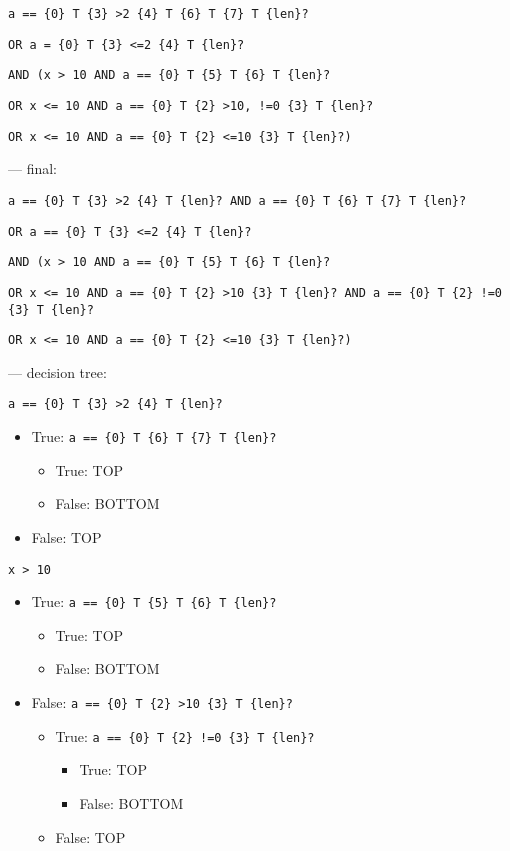 \documentclass[11pt]{article}
\begin{document}
\begin{itemize}
\verb|a == {0} T {3} >2 {4} T {6} T {7} T {len}?|

\verb|OR a = {0} T {3} <=2 {4} T {len}?|

\verb|AND (x > 10 AND a == {0} T {5} T {6} T {len}?|

\verb|OR x <= 10 AND a == {0} T {2} >10, !=0 {3} T {len}?|

\verb|OR x <= 10 AND a == {0} T {2} <=10 {3} T {len}?)|

--- final:

\verb|a == {0} T {3} >2 {4} T {len}? AND a == {0} T {6} T {7} T {len}?|

\verb|OR a == {0} T {3} <=2 {4} T {len}?|

\verb|AND (x > 10 AND a == {0} T {5} T {6} T {len}?|

\verb|OR x <= 10 AND a == {0} T {2} >10 {3} T {len}? AND a == {0} T {2} !=0 {3} T {len}?|

\verb|OR x <= 10 AND a == {0} T {2} <=10 {3} T {len}?)|

--- decision tree:

\verb|a == {0} T {3} >2 {4} T {len}?|
\begin{itemize}
\item True: \verb|a == {0} T {6} T {7} T {len}?|
\begin{itemize}
\item True: TOP
\item False: BOTTOM
\end{itemize}
\item False: TOP
\end{itemize}

\verb|x > 10|
\begin{itemize}
\item True: \verb|a == {0} T {5} T {6} T {len}?|
\begin{itemize}
\item True: TOP
\item False: BOTTOM
\end{itemize}
\item False: \verb|a == {0} T {2} >10 {3} T {len}?|
\begin{itemize}
\item True: \verb|a == {0} T {2} !=0 {3} T {len}?|
\begin{itemize}
\item True: TOP
\item False: BOTTOM
\end{itemize}
\item False: TOP
\end{itemize}
\end{itemize}


\end{itemize}
\end{document}
